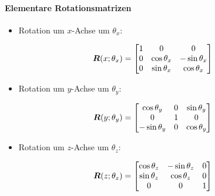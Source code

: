 			\paragraph{Elementare Rotationsmatrizen}
				\begin{itemize}
					\item Rotation um \(x\)-Achse um \(\theta_x\):
				\end{itemize}
				\begin{equation*}
					\bm{R}(x; \theta_x) =
						\begin{bmatrix}
							1 & 0            & 0             \\
							0 & \cos\theta_x & -\sin\theta_x \\
							0 & \sin\theta_x & \cos\theta_x
						\end{bmatrix}
				\end{equation*}
				\begin{itemize}
					\item Rotation um \(y\)-Achse um \(\theta_y\):
				\end{itemize}
				\begin{equation*}
					\bm{R}(y; \theta_y) =
						\begin{bmatrix}
							\cos\theta_y  & 0 & \sin\theta_y \\
							0             & 1 & 0            \\
							-\sin\theta_y & 0 & \cos\theta_y
						\end{bmatrix}
				\end{equation*}
				\begin{itemize}
					\item Rotation um \(z\)-Achse um \(\theta_z\):
				\end{itemize}
				\begin{equation*}
					\bm{R}(z; \theta_z) =
						\begin{bmatrix}
							\cos\theta_z & -\sin\theta_z & 0 \\
							\sin\theta_z & \cos\theta_z  & 0 \\
							0            & 0             & 1
						\end{bmatrix}
				\end{equation*}


